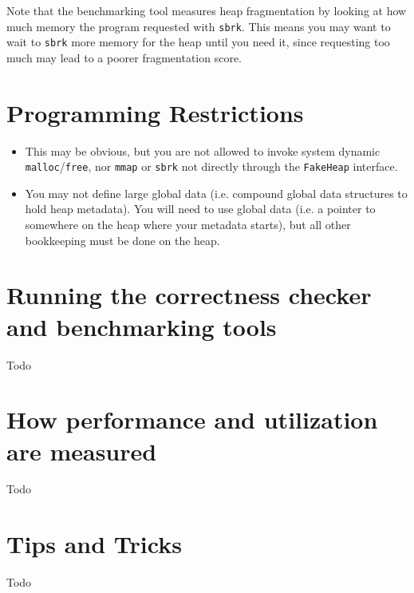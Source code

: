 \documentclass{article}
\begin{document}
Note that the benchmarking tool measures heap fragmentation by looking at how much memory the program requested with \texttt{sbrk}. This means you may want to wait to \texttt{sbrk} more memory for the heap until you need it, since requesting too much may lead to a poorer fragmentation score.

\section*{Programming Restrictions}

\begin{itemize}
  \item This may be obvious, but you are not allowed to invoke system dynamic \texttt{malloc}/\texttt{free}, nor \texttt{mmap} or \texttt{sbrk} not directly through the \texttt{FakeHeap} interface.
  \item You may not define large global data (i.e. compound global data structures to hold heap metadata). You will need to use global data (i.e. a pointer to somewhere on the heap where your metadata starts), but all other bookkeeping must be done on the heap.
\end{itemize}

\section*{Running the correctness checker and benchmarking tools}

Todo

\section*{How performance and utilization are measured}

Todo

\section*{Tips and Tricks}

Todo
\end{document}
